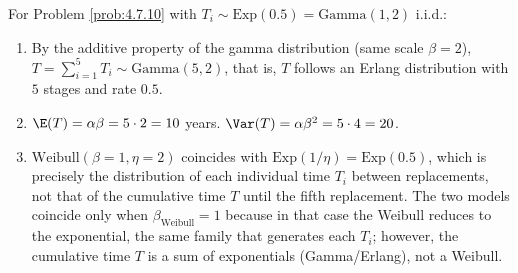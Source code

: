 \begin{solucion}
	\label{sol:4.7.10}
	For Problem \ref{prob:4.7.10} with $T_i \sim \text{Exp}(0.5) = \text{Gamma}(1,2)$ i.i.d.:
	\begin{enumerate}
		\item By the additive property of the gamma distribution (same scale $\beta=2$), $T=\sum_{i=1}^{5}T_i \sim \text{Gamma}(5,2)$, that is, $T$ follows an Erlang distribution with $5$ stages and rate $0.5$.
		\item $\E(T) = \alpha\beta = 5\cdot 2 = 10$ years. $\Var(T) = \alpha\beta^{2} = 5\cdot 4 = 20$.
		\item $\text{Weibull}(\beta=1,\eta=2)$ coincides with $\text{Exp}(1/\eta) = \text{Exp}(0.5)$, which is precisely the distribution of each individual time $T_i$ between replacements, not that of the cumulative time $T$ until the fifth replacement. The two models coincide only when $\beta_{\text{Weibull}}=1$ because in that case the Weibull reduces to the exponential, the same family that generates each $T_i$; however, the cumulative time $T$ is a sum of exponentials (Gamma/Erlang), not a Weibull. \quad \qedhere
	\end{enumerate}
\end{solucion}
